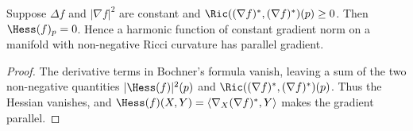 \begin{corollary}
\label{cor:bochner-vanishing}
\leanok



Suppose $\Delta f$ and $|\nabla f|^2$ are constant and
$\Ric((\nabla f)^*,(\nabla f)^*)(p)\ge0$. Then
$\Hess(f)_p=0$. Hence a harmonic function of constant gradient norm on
a manifold with non-negative Ricci curvature has parallel gradient.
\end{corollary}
\begin{proof}
\sketch
{}
\leanok
The derivative terms in Bochner's formula vanish, leaving a sum of the
two non-negative quantities $|\Hess(f)|^2(p)$ and
$\Ric((\nabla f)^*,(\nabla f)^*)(p)$. Thus the Hessian vanishes, and
$\Hess(f)(X,Y)=\langle\nabla_X(\nabla f)^*,Y\rangle$ makes the gradient
parallel.
\end{proof}

